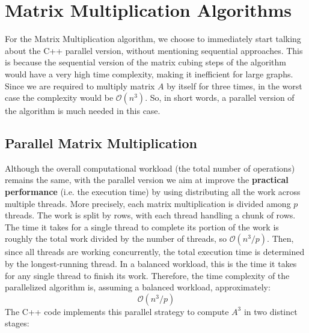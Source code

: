 \documentclass{aes2e}
\begin{document}

\section{Matrix Multiplication Algorithms}
For the Matrix Multiplication algorithm, we choose to immediately start talking about the C++ parallel version, without mentioning sequential approaches. This is because the sequential version of the matrix cubing steps of the algorithm would have a very high time complexity, making it inefficient for large graphs. Since we are required to multiply matrix $A$ by itself for three times, in the worst case the complexity would be $\mathcal{O}(n^3)$. So, in short words, a parallel version of the algorithm is much needed in this case.
\subsection{Parallel Matrix Multiplication }
Although the overall computational workload (the total number of operations) remains the same, with the parallel version we aim at improve the \textbf{practical performance} (i.e. the execution time) by using distributing all the work across multiple threads. More precisely, each matrix multiplication is divided among $p$ threads. The work is split by rows, with each thread handling a chunk of rows. The time it takes for a single thread to complete its portion of the work is roughly the total work divided by the number of threads, so $\mathcal{O}(n^3 / p)$. Then, since all threads are working concurrently, the total execution time is determined by the longest-running thread. In a balanced workload, this is the time it takes for any single thread to finish its work. Therefore, the time complexity of the parallelized algorithm is, assuming a balanced workload, approximately:
$$
\mathcal{O}(n^3 / p)
$$
The C++ code implements this parallel strategy to compute $A^3$ in two distinct stages:
\end{document}
